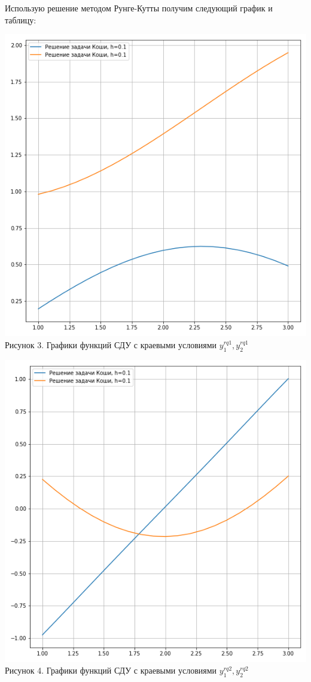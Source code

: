 \documentclass[a4paper,12pt]{article}
\begin{document}
Использую решение методом Рунге-Кутты получим следующий график и таблицу:
\begin{center}
	\includegraphics[scale=0.49]{plot_1}\\
	\color{blue}
	Рисунок 3. Графики функций СДУ с краевыми условиями 	$ y^{rq1}_{1},  y^{rq1}_{2} $
\end{center}



\begin{center}
	\includegraphics[scale=0.49]{plot_2}\\
	\color{blue}
	Рисунок 4. Графики функций СДУ с краевыми условиями 	$ y^{rq2}_{1},  y^{rq2}_{2} $
\end{center}
\clearpage
\end{document}
